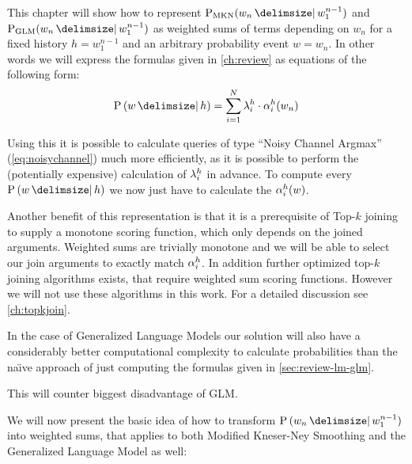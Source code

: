 

This chapter will show how to represent  $\ProbMKN{w_n}{w_1^{n-1}}$ and
$\ProbGLM{w_n}{w_1^{n-1}}$ as weighted sums of terms depending on $w_n$ for a
fixed history $h = w_1^{n-1}$ and an  arbitrary probability event $w = w_n$.
In other words we will express the formulas given in \cref{ch:review} as
equations of the following form:
\begin{equation}
  \Prob{w}{h} = \sum_{i = 1}^{N} \SumWeight_i^h \cdot \SumArg_i^h(w_n)
\end{equation}

Using this it is possible to calculate queries of type ``Noisy Channel Argmax''
(\cref{eq:noisychannel}) much more efficiently, as it is possible to perform the
(potentially expensive) calculation of $\lambda_i^h$ in advance.
To compute every $\Prob{w}{h}$ we now just have to calculate the
$\alpha_i^h(w)$.

Another benefit of this representation is that it is a prerequisite of Top-$k$
joining to supply a monotone scoring function, which only depends on the
joined arguments.
Weighted sums are trivially monotone  and we will be able to
select our join arguments to exactly match $\alpha_i^h$.
In addition further optimized top-$k$ joining algorithms exists, that require
weighted sum scoring functions.
However we will not use these algorithms in this work.
For a detailed discussion see \cref{ch:topkjoin}.

In the case of Generalized Language Models our solution will also have a
considerably better computational complexity to calculate probabilities than the
na{\"\i}ve  approach of just computing
the formulas given in
\cref{sec:review-lm-glm}.
\begin{draft}
This will counter biggest disadvantage of GLM.
\end{draft}

We will now present the basic idea of how to transform $\Prob{w_n}{w_1^{n-1}}$
into weighted sums, that applies to both Modified Kneser-Ney Smoothing and
the Generalized Language Model as well:

